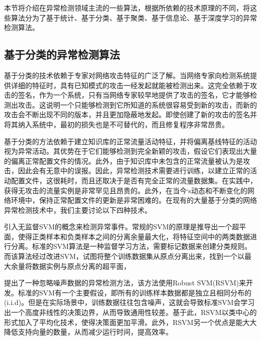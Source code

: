 本节将介绍在异常检测领域主流的一些算法，根据所依赖的技术原理的不同，将这些算法分为了基于统计、基于分类、基于聚类、基于信息论、基于深度学习的异常检测算法。

\subsection{基于分类的异常检测算法}

基于分类的技术依赖于专家对网络攻击特征的广泛了解。当网络专家向检测系统提供详细的特征时，具有已知模式的攻击一经发起就能被检测出来。这完全依赖于攻击的签名，作为一个系统，只有当网络专家较早地提供了攻击的签名，它才能够检测出攻击。这说明一个只能够检测到它所知道的系统很容易受到新的攻击，而新的攻击会不断出现不同的版本，并且更加隐蔽地发起。即使创建了新的攻击的签名并将其纳入系统中，最初的损失也是不可替代的，而且修复程序非常昂贵。

基于分类的方法依赖于建立知识库的正常流量活动特征，并将偏离基线特征的活动视为异常活动。其优势在于它们能够检测到完全新颖的攻击，假设它们表现出大量的偏离正常配置文件的情况。此外，由于知识库中未包含的正常流量被认为是攻击，因此会有无意中的误报。因此，异常检测技术需要进行训练，以建立正常的活动配置文件，这很耗时，而且还取决于是否有完全正常的流量数据集。在实践中，获得无攻击的流量实例是非常罕见且昂贵的。此外，在当今׳s动态和不断变化的网络环境中，保持正常配置文件的更新是非常困难的。在现有的大量基于分类的网络异常检测技术中，我们主要讨论以下四种技术。

\citet{2002AEskin} 引入无监督SVM的概念来检测异常事件。常规的SVM的原理是推导出一个超平面，使得正类样本和负类样本之间的分离余量最大化，将特征空间中的两类数据进行分离。标准的SVM算法是一种监督学习方法，需要标记数据来创建分类规则。而该算法经过改进SVM，试图将整个训练数据集从原点分离出来，找到一个以最大余量将数据实例与原点分离的超平面，

\citet{Hu2003Robust} 提出了一种忽略噪声数据的异常检测方法，该方法使用Robust SVM(RSVM)来开发。标准的SVM有一个主要假设，即所有的训练样本数据都是独立且相同分布的(i.i.d)。但是在实际场景中，训练数据往往包含噪声，这就会导致标准SVM会学习出一个高度非线性的决策边界，从而导致通用性较差。基于此，RSVM以类中心的形式加入了平均化技术，使得决策面更加平滑。此外，RSVM另一个优点是能大大降低支持向量的数量，从而减少运行时间，提高效率。


